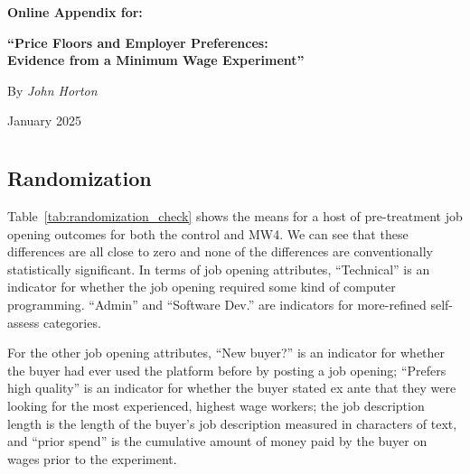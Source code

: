\documentclass[AER]{AEA}
\begin{document}
\clearpage





\clearpage

\newpage

\renewcommand{\leftmark}{ONLINE APPENDIX: PRICE FLOORS AND EMPLOYER PREFERENCES}

\appendix

\renewcommand{\thepage}{A\arabic{page}}  %
\setcounter{page}{1}  %

\begin{center}
\huge\textbf{Online Appendix for:}
\vspace{0.25cm}

\huge\textbf{``Price Floors and Employer Preferences:\\
Evidence from a Minimum Wage Experiment''}

\vspace{0.5cm}
\normalsize By \textit{John Horton}

\vspace{0.5cm}
January 2025
\vspace{-0.5cm}
\end{center}



\section{} \label{sec:iv} 

\subsection{Randomization} \label{sec:randomization} 

Table~\ref{tab:randomization_check} shows the means for a host of pre-treatment job opening outcomes for both the control and MW4.
We can see that these differences are all close to zero and none of the differences are conventionally statistically significant. 
In terms of job opening attributes, ``Technical'' is an indicator for whether the job opening required some kind of computer programming.
``Admin'' and ``Software Dev.'' are indicators for more-refined self-assess categories.

For the other job opening attributes, ``New buyer?'' is an indicator for whether the buyer had ever used the platform before by posting a job opening; ``Prefers high quality'' is an indicator for whether the buyer stated ex ante that they were looking for the most experienced, highest wage workers; the job description length is the length of the buyer's job description measured in characters of text, and ``prior spend'' is the cumulative amount of money paid by the buyer on wages prior to the experiment.   
\end{document}
